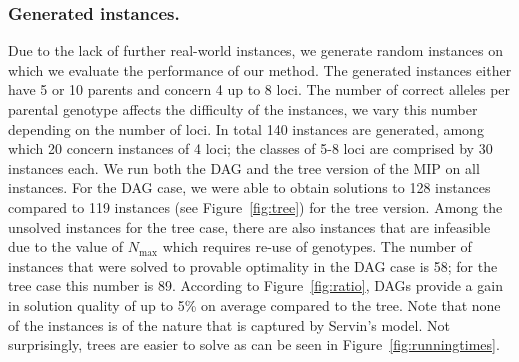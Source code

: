 \documentclass[runningheads]{llncs}
\begin{document}
\subsubsection{Generated instances.} Due to the lack of further real-world instances, we generate random instances on which we evaluate the performance of our method. The generated instances either have 5 or 10 parents and concern 4 up to 8 loci. The number of correct alleles per parental genotype affects the difficulty of the instances, we vary this number depending on the number of loci. In total 140 instances are generated, among which 20 concern instances of 4 loci; the classes of 5-8 loci are comprised by 30 instances each. We run both the DAG and the tree version of the MIP on all instances. For the DAG case, we were able to obtain solutions to 128 instances compared to 119 instances (see Figure~\ref{fig:tree}) for the tree version. Among the unsolved instances for the tree case, there are also instances that are infeasible due to the value of $N_\mathrm{max}$ which requires re-use of genotypes. The number of instances that were solved to provable optimality in the DAG case is 58; for the tree case this number is 89. According to Figure~\ref{fig:ratio}, DAGs provide a gain in solution quality of up to 5\% on average compared to the tree. Note that none of the instances is of the nature that is captured by Servin's model. Not surprisingly, trees are easier to solve as can be seen in Figure~\ref{fig:runningtimes}.
\end{document}

